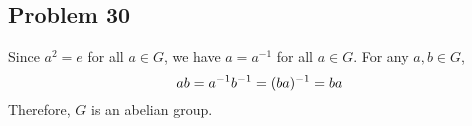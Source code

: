\subsection*{Problem 30}
\noindent Since $a^2 = e$ for all $a \in G$, we have $a = a^{-1}$ for all $a \in G$. For any $a, b \in G$,
\begin{equation} \notag
	ab = a^{-1}b^{-1} = (ba)^{-1} = ba
\end{equation}
Therefore, $G$ is an abelian group.

